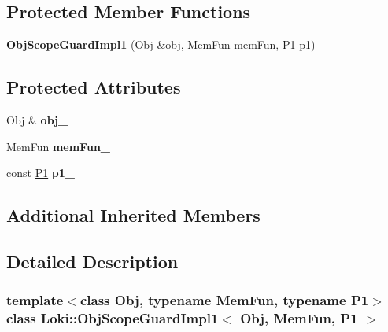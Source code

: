 \subsection*{Protected Member Functions}
\begin{DoxyCompactItemize}
\item 
\hypertarget{classLoki_1_1ObjScopeGuardImpl1_a269858fb1e50c1189fc548edcee7d97a}{}{\bfseries Obj\+Scope\+Guard\+Impl1} (Obj \&obj, Mem\+Fun mem\+Fun, \hyperlink{structP1}{P1} p1)\label{classLoki_1_1ObjScopeGuardImpl1_a269858fb1e50c1189fc548edcee7d97a}

\end{DoxyCompactItemize}
\subsection*{Protected Attributes}
\begin{DoxyCompactItemize}
\item 
\hypertarget{classLoki_1_1ObjScopeGuardImpl1_ab6b19b530a4dc7a651efd3659dd46c97}{}Obj \& {\bfseries obj\+\_\+}\label{classLoki_1_1ObjScopeGuardImpl1_ab6b19b530a4dc7a651efd3659dd46c97}

\item 
\hypertarget{classLoki_1_1ObjScopeGuardImpl1_acafcb16342d38149f8c6af656a90ec8b}{}Mem\+Fun {\bfseries mem\+Fun\+\_\+}\label{classLoki_1_1ObjScopeGuardImpl1_acafcb16342d38149f8c6af656a90ec8b}

\item 
\hypertarget{classLoki_1_1ObjScopeGuardImpl1_a8ae7efc0607fd3a95d71aa913bd8606d}{}const \hyperlink{structP1}{P1} {\bfseries p1\+\_\+}\label{classLoki_1_1ObjScopeGuardImpl1_a8ae7efc0607fd3a95d71aa913bd8606d}

\end{DoxyCompactItemize}
\subsection*{Additional Inherited Members}


\subsection{Detailed Description}
\subsubsection*{template$<$class Obj, typename Mem\+Fun, typename P1$>$class Loki\+::\+Obj\+Scope\+Guard\+Impl1$<$ Obj, Mem\+Fun, P1 $>$}

